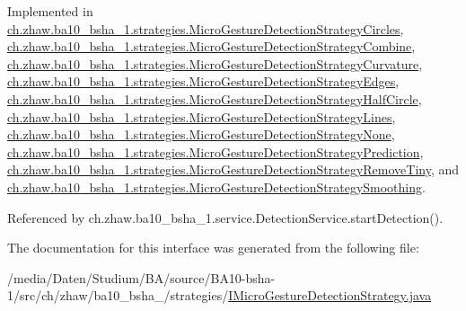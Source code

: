 Implemented in \hyperlink{classch_1_1zhaw_1_1ba10__bsha__1_1_1strategies_1_1MicroGestureDetectionStrategyCircles_a1ce3987ae892eba2d0cf644a111933d3}{ch.zhaw.ba10\_\-bsha\_\-1.strategies.MicroGestureDetectionStrategyCircles}, \hyperlink{classch_1_1zhaw_1_1ba10__bsha__1_1_1strategies_1_1MicroGestureDetectionStrategyCombine_a5487e41dc2d1b6dbe493b5a8420c050f}{ch.zhaw.ba10\_\-bsha\_\-1.strategies.MicroGestureDetectionStrategyCombine}, \hyperlink{classch_1_1zhaw_1_1ba10__bsha__1_1_1strategies_1_1MicroGestureDetectionStrategyCurvature_a939545a8c5597d693f4857a8f6195fc9}{ch.zhaw.ba10\_\-bsha\_\-1.strategies.MicroGestureDetectionStrategyCurvature}, \hyperlink{classch_1_1zhaw_1_1ba10__bsha__1_1_1strategies_1_1MicroGestureDetectionStrategyEdges_a16cd0b9ef604ba14a7eb573a77966c4f}{ch.zhaw.ba10\_\-bsha\_\-1.strategies.MicroGestureDetectionStrategyEdges}, \hyperlink{classch_1_1zhaw_1_1ba10__bsha__1_1_1strategies_1_1MicroGestureDetectionStrategyHalfCircle_a780f7ded471f8e1dbd141518c41c060e}{ch.zhaw.ba10\_\-bsha\_\-1.strategies.MicroGestureDetectionStrategyHalfCircle}, \hyperlink{classch_1_1zhaw_1_1ba10__bsha__1_1_1strategies_1_1MicroGestureDetectionStrategyLines_ac4a6ad22e6ca3b595006c0b956fdd208}{ch.zhaw.ba10\_\-bsha\_\-1.strategies.MicroGestureDetectionStrategyLines}, \hyperlink{classch_1_1zhaw_1_1ba10__bsha__1_1_1strategies_1_1MicroGestureDetectionStrategyNone_affb5fbb496f04e53720496e1cc3feb88}{ch.zhaw.ba10\_\-bsha\_\-1.strategies.MicroGestureDetectionStrategyNone}, \hyperlink{classch_1_1zhaw_1_1ba10__bsha__1_1_1strategies_1_1MicroGestureDetectionStrategyPrediction_af8639be36ae7218b7f7d2feee8edc86f}{ch.zhaw.ba10\_\-bsha\_\-1.strategies.MicroGestureDetectionStrategyPrediction}, \hyperlink{classch_1_1zhaw_1_1ba10__bsha__1_1_1strategies_1_1MicroGestureDetectionStrategyRemoveTiny_a3a51833545b6e87173dbacf505e44359}{ch.zhaw.ba10\_\-bsha\_\-1.strategies.MicroGestureDetectionStrategyRemoveTiny}, and \hyperlink{classch_1_1zhaw_1_1ba10__bsha__1_1_1strategies_1_1MicroGestureDetectionStrategySmoothing_acdb5b6b2bb7ad9f48c79b88770113f45}{ch.zhaw.ba10\_\-bsha\_\-1.strategies.MicroGestureDetectionStrategySmoothing}.

Referenced by ch.zhaw.ba10\_\-bsha\_\-1.service.DetectionService.startDetection().

The documentation for this interface was generated from the following file:\begin{DoxyCompactItemize}
\item 
/media/Daten/Studium/BA/source/BA10-\/bsha-\/1/src/ch/zhaw/ba10\_\-bsha\_/strategies/\hyperlink{IMicroGestureDetectionStrategy_8java}{IMicroGestureDetectionStrategy.java}\end{DoxyCompactItemize}
